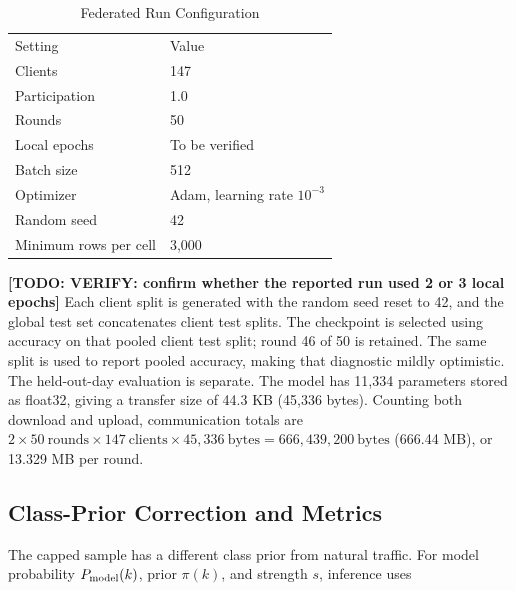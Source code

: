 \documentclass[conference]{IEEEtran}
\newcommand{\todo}[1]{\textbf{[TODO: #1]}}
\begin{document}
\begin{table}[t]\caption{Federated Run Configuration}\label{tab:config}\centering\footnotesize

\begin{tabular}{ll}\toprule Setting & Value \\

Clients & 147 \\

Participation & 1.0 \\

Rounds & 50 \\

Local epochs & To be verified \\

Batch size & 512 \\

Optimizer & Adam, learning rate $10^{-3}$ \\

Random seed & 42 \\

Minimum rows per cell & 3,000 \\

\bottomrule\end{tabular}\end{table}



\todo{VERIFY: confirm whether the reported run used 2 or 3 local epochs} Each client split is generated with the random seed reset to 42, and the global test set concatenates client test splits. The checkpoint is selected using accuracy on that pooled client test split; round 46 of 50 is retained. The same split is used to report pooled accuracy, making that diagnostic mildly optimistic. The held-out-day evaluation is separate. The model has 11,334 parameters stored as float32, giving a transfer size of 44.3 KB (45,336 bytes). Counting both download and upload, communication totals are $2\times50~\mathrm{rounds}\times147~\mathrm{clients}\times45{,}336~\mathrm{bytes}=666{,}439{,}200~\mathrm{bytes}$ (666.44 MB), or 13.329 MB per round.



\subsection{Class-Prior Correction and Metrics}

The capped sample has a different class prior from natural traffic. For model probability $P_{\rm model}(k)$, prior $\pi(k)$, and strength $s$, inference uses
\end{document}
